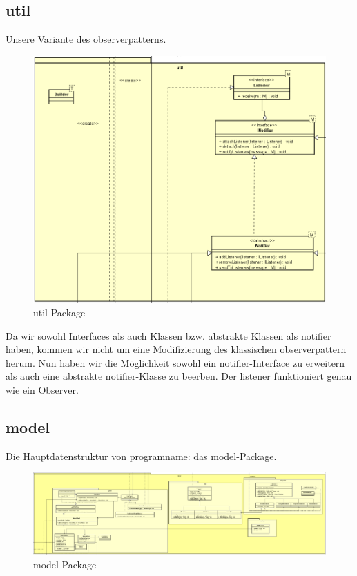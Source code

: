 \subsection{util}
\label{subsec:util}


Unsere Variante des \gls{observerpattern}s.

\begin{figure}[H]
  \centering
  \includegraphics[width=\textwidth]{../diagramimages/util.png}
  \caption{util-Package}
\end{figure}

Da wir sowohl Interfaces als auch Klassen bzw. abstrakte Klassen als
\gls{notifier} haben, kommen wir nicht um eine Modifizierung des klassischen
\gls{observerpattern} herum. Nun haben wir die Möglichkeit sowohl ein
\gls{notifier}-Interface zu erweitern als auch eine abstrakte
\gls{notifier}-Klasse zu beerben. Der \gls{listener} funktioniert genau wie ein
Observer.


\subsection{model}


Die Hauptdatenstruktur von \gls{programname}: das model-Package.

\begin{figure}[H]
  \centering
  \includegraphics[width=\textwidth]{../diagramimages/model.png}
  \caption{model-Package}
\end{figure}

